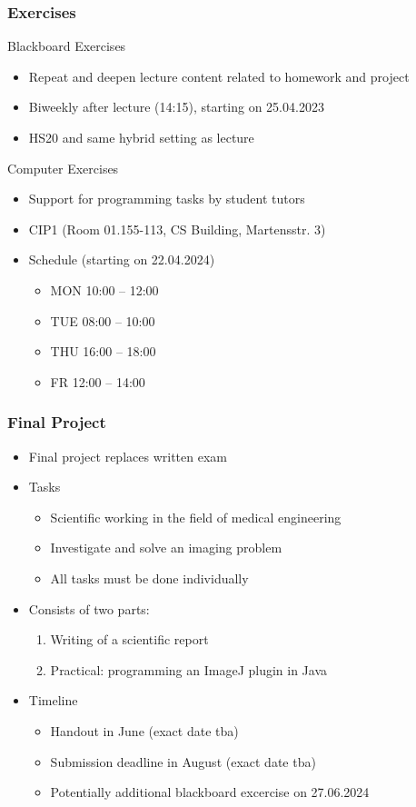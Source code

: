 \begin{frame}
	\frametitle{Exercises}
	\begin{block}{Blackboard Exercises}
		\begin{itemize}
			\item Repeat and deepen lecture content related to homework and project
			\item Biweekly after lecture (14:15), starting on 25.04.2023
			\item HS20 and same hybrid setting as lecture
		\end{itemize}
	\end{block}
	\begin{block}{Computer Exercises}
		\begin{itemize}
			\item Support for programming tasks by student tutors
			\item CIP1 (Room 01.155-113, CS Building, Martensstr. 3)
			\item Schedule (starting on 22.04.2024)
			\begin{itemize}
				\item MON 10:00 -- 12:00
				\item TUE 08:00 -- 10:00
				\item THU 16:00 -- 18:00
				\item FR 12:00 -- 14:00
			\end{itemize}
		\end{itemize}
	\end{block}
\end{frame}

\begin{frame}
	\frametitle{Final Project}
	\begin{itemize}
		\item Final project replaces written exam
		\item Tasks
		\begin{itemize}
			\item Scientific working in the field of medical engineering
			\item Investigate and solve an imaging problem
			\item All tasks must be done individually
		\end{itemize}
		\item Consists of two parts:
		\begin{enumerate}
			\item Writing of a scientific report
			\item Practical: programming an ImageJ plugin in Java
		\end{enumerate}
		\item Timeline
		\begin{itemize}
			\item Handout in June (exact date tba)
			\item Submission deadline in August (exact date tba)
			\item Potentially additional blackboard excercise on 27.06.2024
		\end{itemize}
	\end{itemize}
\end{frame}

